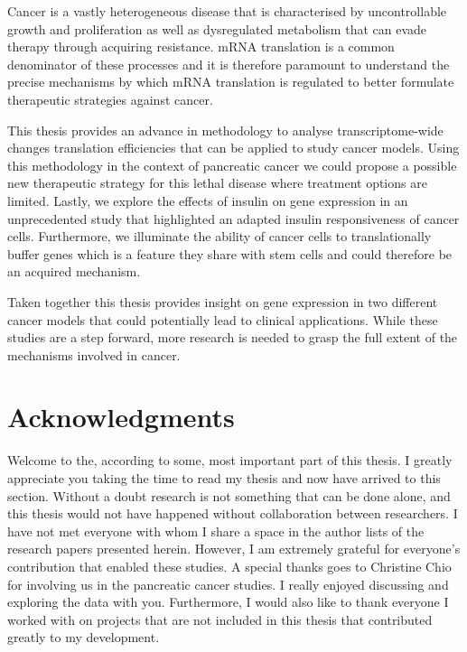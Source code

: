 \documentclass[
  12pt,
  openany]{book}
\begin{document}
Cancer is a vastly heterogeneous disease that is characterised by uncontrollable growth and proliferation as well as dysregulated metabolism that can evade therapy through acquiring resistance. mRNA translation is a common denominator of these processes and it is therefore paramount to understand the precise mechanisms by which mRNA translation is regulated to better formulate therapeutic strategies against cancer.

This thesis provides an advance in methodology to analyse transcriptome-wide changes translation efficiencies that can be applied to study cancer models. Using this methodology in the context of pancreatic cancer we could propose a possible new therapeutic strategy for this lethal disease where treatment options are limited. Lastly, we explore the effects of insulin on gene expression in an unprecedented study that highlighted an adapted insulin responsiveness of cancer cells. Furthermore, we illuminate the ability of cancer cells to translationally buffer genes which is a feature they share with stem cells and could therefore be an acquired mechanism.

Taken together this thesis provides insight on gene expression in two different cancer models that could potentially lead to clinical applications. While these studies are a step forward, more research is needed to grasp the full extent of the mechanisms involved in cancer.

\hypertarget{acknowledgments}{%
\chapter*{Acknowledgments}\label{acknowledgments}}

Welcome to the, according to some, most important part of this thesis. I greatly appreciate you taking the time to read my thesis and now have arrived to this section.
Without a doubt research is not something that can be done alone, and this thesis would not have happened without collaboration between researchers. I have not met everyone with whom I share a space in the author lists of the research papers presented herein. However, I am extremely grateful for everyone's contribution that enabled these studies. A special thanks goes to Christine Chio for involving us in the pancreatic cancer studies. I really enjoyed discussing and exploring the data with you. Furthermore, I would also like to thank everyone I worked with on projects that are not included in this thesis that contributed greatly to my development.
\end{document}
